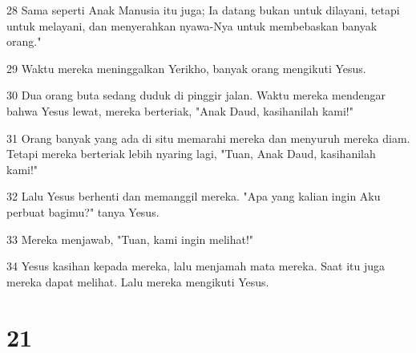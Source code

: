 \par 28 Sama seperti Anak Manusia itu juga; Ia datang bukan untuk dilayani, tetapi untuk melayani, dan menyerahkan nyawa-Nya untuk membebaskan banyak orang."
\par 29 Waktu mereka meninggalkan Yerikho, banyak orang mengikuti Yesus.
\par 30 Dua orang buta sedang duduk di pinggir jalan. Waktu mereka mendengar bahwa Yesus lewat, mereka berteriak, "Anak Daud, kasihanilah kami!"
\par 31 Orang banyak yang ada di situ memarahi mereka dan menyuruh mereka diam. Tetapi mereka berteriak lebih nyaring lagi, "Tuan, Anak Daud, kasihanilah kami!"
\par 32 Lalu Yesus berhenti dan memanggil mereka. "Apa yang kalian ingin Aku perbuat bagimu?" tanya Yesus.
\par 33 Mereka menjawab, "Tuan, kami ingin melihat!"
\par 34 Yesus kasihan kepada mereka, lalu menjamah mata mereka. Saat itu juga mereka dapat melihat. Lalu mereka mengikuti Yesus.

\chapter{21}

